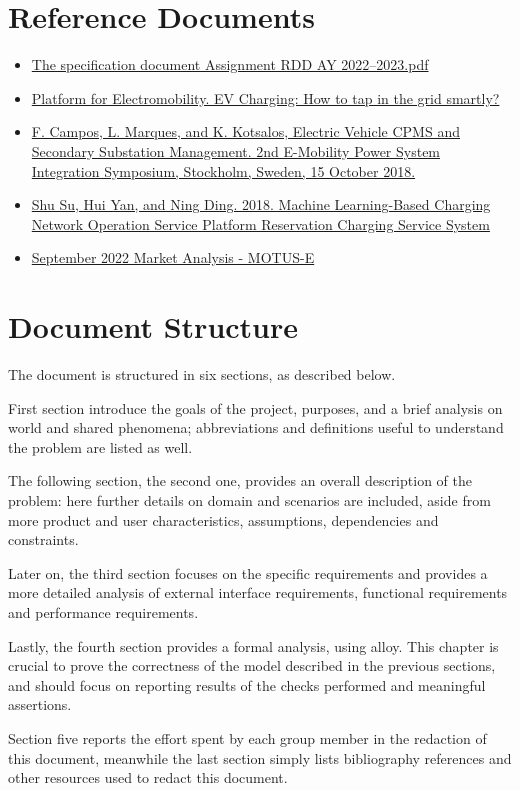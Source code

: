 \section{Reference Documents}
\label{sec:reference_documents}%
\begin{itemize}
    \item \href{https://polimi365-my.sharepoint.com/:b:/g/personal/10685242_polimi_it/EWPABzzjfF9EsgYvSiuvdAIBAz6qnjdfLuPE8kwQSxeyCg?e=6qasKD}{The specification document Assignment RDD AY 2022--2023.pdf}
    \item \href{https://www.platformelectromobility.eu/2022/05/17/ev-charging-how-to-tap-in-the-grid-smartly/}{Platform for Electromobility. EV Charging: How to tap in the grid smartly?}
    \item \href{https://mobilityintegrationsymposium.org/wp-content/uploads/sites/10/2018/11/4A_3_Emob18_024_paper_Filipe_Campos.pdf}{F. Campos, L. Marques, and K. Kotsalos, Electric Vehicle CPMS and Secondary Substation Management. 2nd E-Mobility Power System Integration Symposium,  Stockholm,  Sweden,  15 October 2018. }
    \item \href{https://polimi365-my.sharepoint.com/:b:/g/personal/10685242_polimi_it/EfCXzQWCkK1Lsdtr4suEMp8B7YR3drdGqkArs7hnEx-bqA?e=xy1OTu}{Shu Su, Hui Yan, and Ning Ding. 2018. Machine Learning-Based Charging Network Operation Service Platform Reservation Charging Service System}
    \item \href{https://www.motus-e.org/analisi-di-mercato/settembre-2022-troppa-incertezza-consumatori-preoccupati-non-acquistano/}{September 2022 Market Analysis - MOTUS-E}
\end{itemize}


\section{Document Structure}
\label{sec:document_structure}%
The document is structured in six sections, as described below.

First section introduce the goals of the project, purposes, and a brief analysis on world and shared phenomena;
abbreviations and definitions useful to understand the problem are listed as well.

The following section, the second one, provides an overall description of the problem: here further
details on domain and scenarios are included, aside from more product and user characteristics, assumptions,
dependencies and constraints.

Later on, the third section focuses on the specific requirements and provides a more detailed analysis of external
interface requirements, functional requirements and performance requirements.

Lastly, the fourth section provides a formal analysis, using alloy.
This chapter is crucial to prove the correctness of the model described in the previous sections, and should focus on
reporting results of the checks performed and meaningful assertions.

Section five reports the effort spent by each group member in the redaction of this document, meanwhile the last
section simply lists bibliography references and other resources used to redact this document.
